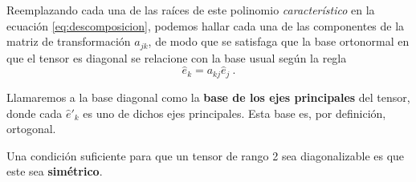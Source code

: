 Reemplazando cada una de las raíces de este polinomio \emph{característico} en la ecuación \eqref{eq:descomposicion}, podemos hallar cada una de las componentes de la matriz de transformación $a_{jk}$, de modo que se satisfaga que la base ortonormal en que el tensor es diagonal se relacione con la base usual según la regla
\begin{equation}
    \hat{e}_k = a_{kj} \hat{e}_j \ .
\end{equation}

Llamaremos a la base diagonal como la \textbf{base de los ejes principales} del tensor, donde cada $\hat{e}'_k$ es uno de dichos ejes principales. Esta base es, por definición, ortogonal.

Una condición suficiente para que un tensor de rango 2 sea diagonalizable es que este sea \textbf{simétrico}.

